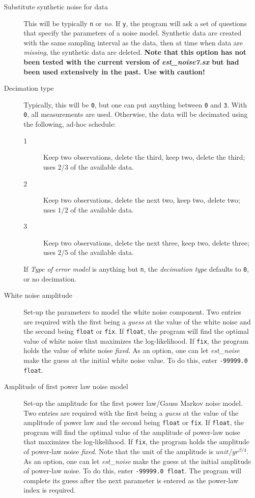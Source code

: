 \documentclass[12pt]{amsart}
\begin{document}
\begin{description}
\item[Substitute synthetic noise for data]  This will be typically \texttt{n} or \textit{no}.  If \texttt{y}, the program will
ask a set of questions that specify the parameters of a noise model. Synthetic data are created with the same
sampling interval as the data, then at time when data are \textit{missing}, the synthetic data are deleted. \textbf{Note that
this option has not been tested with the current version of \textit{est\_noise7.sx} but had been used extensively in
the past. Use with caution!}

\item[Decimation type]  Typically, this will be \texttt{0}, but one can put anything between \texttt{0} and \texttt{3}.
With \texttt{0}, all measurements are used.  Otherwise, the data will be decimated using the following, ad-hoc schedule:
\begin{description}
\item[1]  Keep two observations, delete the third, keep two, delete the third; uses $2/3$ of the available data.
\item[2] Keep two observations, delete the next two, keep two, delete two; uses $1/2$ of the available data.
\item[3] Keep two observations, delete the next three, keep two, delete three; uses $2/5$ of the available data.
\end{description}
If \textit{Type of error model} is anything but \texttt{n}, the \textit{decimation type} defaults to \texttt{0}, or no decimation.

\item[White noise amplitude] Set-up the parameters to model the white noise component. Two entries are required
with the first being a \textit{guess} at the value of the white noise and the second being \texttt{float} or \texttt{fix}.
If \texttt{float}, the program will find the optimal value of white noise that maximizes the log-likelihood. If \texttt{fix},
the program holds the value of white noise \textit{fixed}.  As an option, one can let \textit{est\_noise} make the guess
at the initial white noise value.  To do this, enter \texttt{-99999.0 float}.

\item[Amplitude of first power law noise model] Set-up the amplitude for the first power law/Gauss Markov noise model. Two entries are required
with the first being a \textit{guess} at the value of the amplitude of power law and the second being \texttt{float} or \texttt{fix}.
If \texttt{float}, the program will find the optimal value of the amplitude of power-law noise that maximizes the log-likelihood. If \texttt{fix},
the program holds the amplitude of power-law noise \textit{fixed}.  Note that the unit of the amplitude is $unit/{yr^{{\beta}/4}}$.
As an option, one can let \textit{est\_noise} make the guess
at the initial amplitude of power-law noise.  To do this, enter \texttt{-99999.0 float}.  The program will complete its guess
after the next parameter is entered as the power-law index is required.


\end{description}
\end{document}
